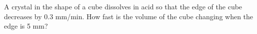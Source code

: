 A crystal in the shape of a cube dissolves
in acid so that the edge of the cube decreases
by 0.3 mm/min. How fast is the volume of
the cube changing when the edge is 5 mm?\answercheck
